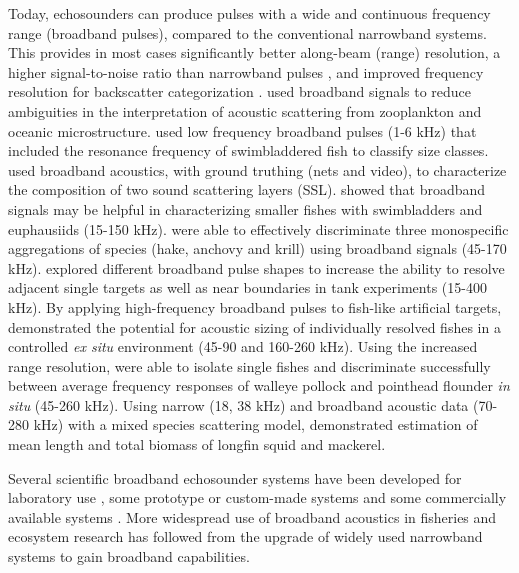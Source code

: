 \documentclass[preprint,12pt,TurnOnLineNumbers]{JASAnew}
\begin{document}
Today, echosounders can produce pulses with a wide and continuous frequency range (broadband pulses), compared to the conventional narrowband systems. This provides in most cases significantly better along-beam (range) resolution, a higher signal-to-noise ratio than narrowband pulses \citep{Chu1998Application, ehrenbergFMSlideChirp2000}, and improved frequency resolution for backscatter categorization \citep{korneliussen2018}.  \citet{lavery_measurements_2010} used broadband signals to reduce ambiguities in the interpretation of acoustic scattering from zooplankton and oceanic microstructure. \citet{Stanton2012Resonance} used low frequency broadband pulses (1-6 kHz) that included the resonance frequency of swimbladdered fish to classify size classes. \citet{blanluet_characterization_2019} used broadband acoustics, with ground truthing (nets and video), to characterize the composition of two sound scattering layers (SSL). \citet{bassett_broadband_2018} showed that broadband signals may be helpful in characterizing smaller fishes with swimbladders and euphausiids (15-150 kHz). \citet{benoit-bird_exploring_2020} were able to effectively discriminate three monospecific aggregations of species (hake, anchovy and krill) using broadband signals (45-170 kHz). \citet{lavery2017} explored different broadband pulse shapes to increase the ability to resolve adjacent single targets as well as near boundaries in tank experiments (15-400 kHz). By applying high-frequency broadband pulses to fish-like artificial targets, \citet{kubilius_remote_2020, kubilius_remote_2023} demonstrated the potential for acoustic sizing of individually resolved fishes in a controlled \textit{ex situ} environment (45-90 and 160-260 kHz). Using the increased range resolution, \citet{hasegawa_situ_2021} were able to isolate single fishes and discriminate successfully between average frequency responses of walleye pollock and pointhead flounder \textit{in situ} (45-260 kHz). Using narrow (18, 38 kHz) and broadband acoustic data (70-280 kHz) with a mixed species scattering model,  \citet{loranger_broadband_2022} demonstrated estimation of mean length and total biomass of longfin squid and mackerel. 

Several scientific broadband echosounder systems have been developed for laboratory use \citep{Conti2003Wide-bandwidth, Forland2014Scattering, chu1992}, some prototype or custom-made systems \citep{Zakharia1989Wide-band, Zakharia1996Wideband, Simmonds1996Species, Foote2005Measuring, Imaizumi2009Detection, Briseno-Avena2015ZOOPS, Barr2002Target} and some commercially available systems \citep{Gordon1998FishMASS, Zedel2003Acoustic, Stanton2010New, ehrenbergFMSlideChirp2000, dennyBroadbandAcousticFish1998}. More widespread use of broadband acoustics in fisheries and ecosystem research has followed from the upgrade of widely used narrowband systems to gain broadband capabilities.
\end{document}
